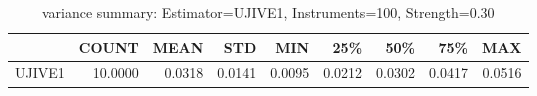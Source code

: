 \begin{table}[ht]
\centering
\caption{variance summary: Estimator=UJIVE1, Instruments=100, Strength=0.30}
\begin{tabular}{lrrrrrrrr}
\toprule
 & COUNT & MEAN & STD & MIN & 25\% & 50\% & 75\% & MAX \\
\midrule
UJIVE1 & 10.0000 & 0.0318 & 0.0141 & 0.0095 & 0.0212 & 0.0302 & 0.0417 & 0.0516 \\
\bottomrule
\end{tabular}
\end{table}
